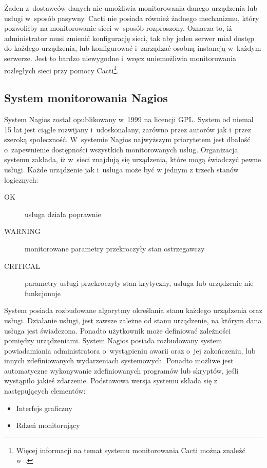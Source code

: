 Żaden z~dostawców danych nie umożliwia monitorowania danego urządzenia
lub usługi w~sposób pasywny. Cacti nie posiada również żadnego
mechanizmu, który pozwoliłby na monitorowanie sieci w~sposób
rozproszony. Oznacza to, iż administrator musi zmienić konfigurację
sieci, tak aby jeden serwer miał dostęp do każdego urządzenia, lub
konfigurować i~zarządzać osobną instancją w~każdym serwerze. Jest to
bardzo niewygodne i~wręcz uniemożliwia monitorowania rozległych sieci
przy pomocy Cacti\footnote{Więcej informacji na temat systemu
  monitorowania Cacti można znaleźć w~\cite{www:Cacti}.}.

\subsection[Nagios][System monitorowania Nagios]{System monitorowania Nagios}

System Nagios został opublikowany w~1999 na licencji GPL. System od
niemal 15 lat jest ciągle rozwijany i~udoskonalany, zarówno przez
autorów jak i~przez szeroką społeczność. W~systemie Nagios najwyższym
priorytetem jest dbałość o~zapewnienie dostępności wszystkich
monitorowanych usług. Organizacja systemu zakłada, iż w~sieci znajdują
się urządzenia, które mogą świadczyć pewne usługi. Każde urządzenie
jak i~usługa może być w jednym z trzech stanów logicznych:

\begin{description}
\item[OK] usługa działa poprawnie
\item[WARNING] monitorowane parametry przekroczyły stan ostrzegawczy
\item[CRITICAL] parametry usługi przekroczyły stan krytyczny, usługa
  lub urządzenie nie funkcjonuje
\end{description}

System posiada rozbudowane algorytmy określania stanu każdego
urządzenia oraz usługi. Działanie usługi, jest zawsze zależne od stanu
urządzenie, na którym dana usługa jest świadczona. Ponadto użytkownik
może definiować zależności pomiędzy urządzeniami. System Nagios
posiada rozbudowany system powiadamiania administratora o~wystąpieniu
awarii oraz o~jej zakończeniu, lub innych zdefiniowanych wydarzeniach
systemowych. Ponadto możliwe jest automatyczne wykonywanie
zdefiniowanych programów lub skryptów, jeśli wystąpiło jakieś
zdarzenie. Podstawowa wersja systemu składa się z następujących
elementów:

\begin{itemize}
\item Interfejs graficzny
\item Rdzeń monitorujący
\end{itemize}

